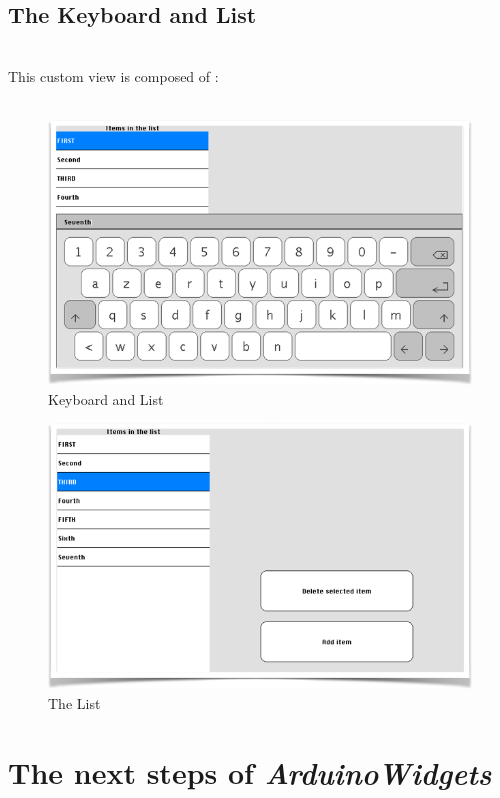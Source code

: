\documentclass[a4paper,11pt]{extarticle}
\begin{document}
\newpage
\subsection{The Keyboard and List}

~\\ This custom view is composed of :
~\\
~\\

\begin{figure}[htbp]
   \centering
   \includegraphics[scale=0.7]{AWFig21.png} 
   \caption{Keyboard and List}
   \label{fig:21 }
\end{figure}

\begin{figure}[htbp]
   \centering
   \includegraphics[scale=0.7]{AWFig22.png} 
   \caption{The List}
   \label{fig:22 }
\end{figure}


\newpage
\section{The next steps of \emph{ArduinoWidgets}}
\end{document}
